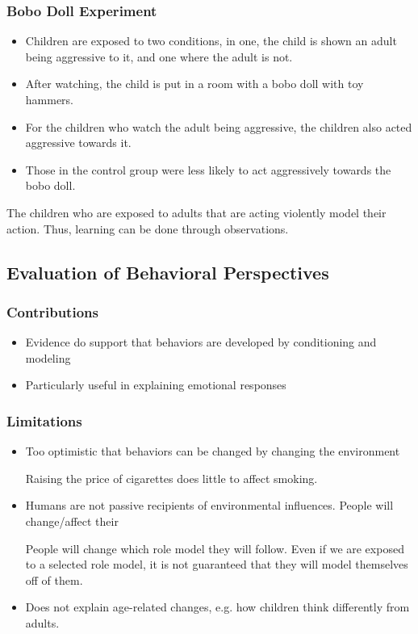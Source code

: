 \documentclass[../main/main.tex]{subfiles}
\begin{document}
\subsubsection{Bobo Doll Experiment} 
\begin{itemize}
  \item Children are exposed to two conditions, in one, the child is shown an adult being aggressive to it, and one where the adult is not.
    \item After watching, the child is put in a room with a bobo doll with toy hammers.
        \item For the children who watch the adult being aggressive, the children also acted aggressive towards it.
        \item Those in the control group were less likely to act aggressively towards the bobo doll.
\end{itemize}
\begin{remark}
The children who are exposed to adults that are acting violently model their action. Thus, learning can be done through observations.
\end{remark}


\subsection{Evaluation of Behavioral Perspectives}
\subsubsection{Contributions}
\begin{itemize}
  \item Evidence do support that behaviors are developed by conditioning and modeling
        \item Particularly useful in explaining emotional responses
\end{itemize}

\subsubsection{Limitations}
\begin{itemize}
  \item Too optimistic that behaviors can be changed by changing the environment
        \begin{example}
Raising the price of cigarettes does little to affect smoking.
        \end{example}
  \item Humans are not passive recipients of environmental influences. People will change/affect their
        \begin{example}
People will change which role model they will follow. Even if we are exposed to a selected role model, it is not guaranteed that they will model themselves off of them.
        \end{example}

    \item Does not explain age-related changes, e.g. how children think differently from adults.
\end{itemize}
\end{document}
